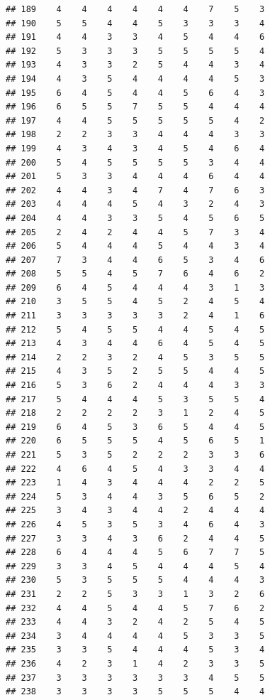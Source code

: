 \documentclass[
]{article}
\begin{document}
\begin{verbatim}
## 189    4    4    4    4    4    4    7    5    3
## 190    5    5    4    4    5    3    3    3    4
## 191    4    4    3    3    4    5    4    4    6
## 192    5    3    3    3    5    5    5    5    4
## 193    4    3    3    2    5    4    4    3    4
## 194    4    3    5    4    4    4    4    5    3
## 195    6    4    5    4    4    5    6    4    3
## 196    6    5    5    7    5    5    4    4    4
## 197    4    4    5    5    5    5    5    4    2
## 198    2    2    3    3    4    4    4    3    3
## 199    4    3    4    3    4    5    4    6    4
## 200    5    4    5    5    5    5    3    4    4
## 201    5    3    3    4    4    4    6    4    4
## 202    4    4    3    4    7    4    7    6    3
## 203    4    4    4    5    4    3    2    4    3
## 204    4    4    3    3    5    4    5    6    5
## 205    2    4    2    4    4    5    7    3    4
## 206    5    4    4    4    5    4    4    3    4
## 207    7    3    4    4    6    5    3    4    6
## 208    5    5    4    5    7    6    4    6    2
## 209    6    4    5    4    4    4    3    1    3
## 210    3    5    5    4    5    2    4    5    4
## 211    3    3    3    3    3    2    4    1    6
## 212    5    4    5    5    4    4    5    4    5
## 213    4    3    4    4    6    4    5    4    5
## 214    2    2    3    2    4    5    3    5    5
## 215    4    3    5    2    5    5    4    4    5
## 216    5    3    6    2    4    4    4    3    3
## 217    5    4    4    4    5    3    5    5    4
## 218    2    2    2    2    3    1    2    4    5
## 219    6    4    5    3    6    5    4    4    5
## 220    6    5    5    5    4    5    6    5    1
## 221    5    3    5    2    2    2    3    3    6
## 222    4    6    4    5    4    3    3    4    4
## 223    1    4    3    4    4    4    2    2    5
## 224    5    3    4    4    3    5    6    5    2
## 225    3    4    3    4    4    2    4    4    4
## 226    4    5    3    5    3    4    6    4    3
## 227    3    3    4    3    6    2    4    4    5
## 228    6    4    4    4    5    6    7    7    5
## 229    3    3    4    5    4    4    4    5    4
## 230    5    3    5    5    5    4    4    4    3
## 231    2    2    5    3    3    1    3    2    6
## 232    4    4    5    4    4    5    7    6    2
## 233    4    4    3    2    4    2    5    4    5
## 234    3    4    4    4    4    5    3    3    5
## 235    3    3    5    4    4    4    5    3    4
## 236    4    2    3    1    4    2    3    3    5
## 237    3    3    3    3    3    3    4    5    5
## 238    3    3    3    3    5    5    5    4    4

\end{verbatim}
\end{document}
